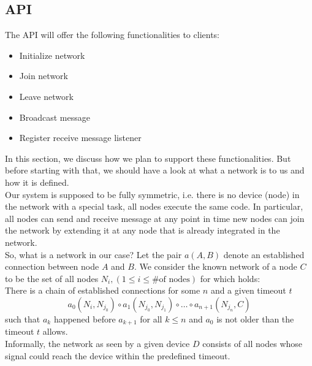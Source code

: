 		\subsection{API}
		The API will offer the following functionalities to clients:
		\begin{itemize}
			\item {Initialize network}
			\item {Join network}
			\item {Leave network}
			\item {Broadcast message}
			\item {Register receive message listener}
		\end{itemize}
		In this section, we discuss how we plan to support these functionalities. But before starting with that, we should have a look at
		what a network is to us and how it is defined.\\
		Our system is supposed to be fully symmetric, i.e. there is no device (node) in the network with a special task, all nodes execute the same code. In particular, all nodes can send and receive message at any point in time new nodes can join the network by extending it at any node that is already integrated in the network.\\
		So, what is a network in our case? Let the pair $a(A,B)$ denote an established connection between node $A$ and $B$. We consider the known network of a node $C$ to be the set of all nodes $N_i, (1 \leq i \leq \text{\# of nodes})$ for which holds:  \\
		There is a chain of established connections for some $n$ and a given timeout $t$
		\begin{displaymath}
			a_0(N_{i},N_{j_0}) \circ a_1(N_{j_0},N_{j_1}) \circ \ldots \circ a_{n+1}(N_{j_n},C)
		\end{displaymath}
		such that $a_k$ happened before $a_{k+1}$ for all $k \leq n$ and $a_0$ is not older than the timeout $t$ allows. \\
		Informally, the network as seen by a given device $D$ consists of all nodes whose signal could reach the device within the predefined timeout. \\ \\
			
